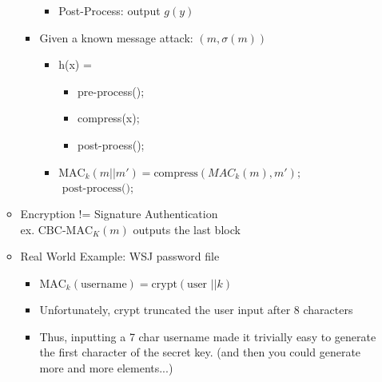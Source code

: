 \begin{itemize}
\begin{itemize}
\begin{itemize}
\begin{itemize}
            \item Post-Process: output $g(y)$  
            \end{itemize}  
        \item Given a known message attack: $(m, \sigma(m))$
            \begin{itemize}
            \item h(x) = 
                \begin{itemize}
                \item pre-process();
                \item compress(x);
                \item post-proess();
                \end{itemize}
            \item $\text{MAC}_k(m||m') = \text{compress}(MAC_k(m),m');$
                \\$\text{                post-process()}$;
            \end{itemize}
    \end{itemize}  
    \item Encryption != Signature Authentication
        \\ex. $\text{CBC-MAC}_K(m)$ outputs the last block
    \item Real World Example: WSJ password file  
        \begin{itemize}
        \item $\text{MAC}_k(\text{username}) = \text{crypt}(\text{user }||k)$
        \item Unfortunately, crypt truncated the user input after 8 characters
        \item Thus, inputting a 7 char username made it trivially easy to generate the first character of the secret key. (and then you could generate more and more elements...)
        \end{itemize}
    \end{itemize}
\end{itemize}